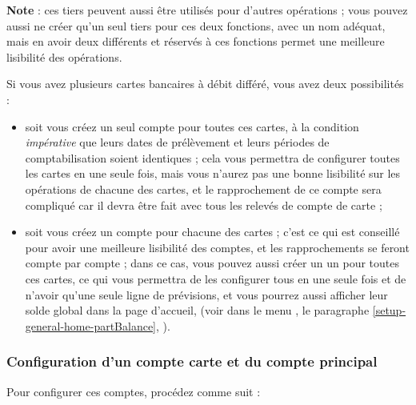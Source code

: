 \begin{enumerate}
	\textbf{Note} : ces tiers peuvent aussi être utilisés pour d'autres opérations ; vous pouvez aussi ne créer qu'un seul tiers pour ces deux fonctions, avec un nom adéquat, mais en avoir deux différents et réservés à ces fonctions permet une meilleure lisibilité des opérations. 		
\end{enumerate}

Si vous avez plusieurs cartes bancaires à débit différé, vous avez deux possibilités :

\begin{itemize}
	\item soit vous créez un seul compte pour toutes ces cartes, à la condition \emph{impérative} que leurs dates de prélèvement et leurs périodes de comptabilisation soient identiques ; cela vous permettra de configurer toutes les cartes en une seule fois, mais vous n'aurez pas une bonne lisibilité sur les opérations de chacune des cartes, et le rapprochement de ce compte sera compliqué car il devra être fait avec tous les relevés de compte de carte ;
	
	\item soit vous créez un compte pour chacune des cartes ; c'est ce qui est conseillé pour avoir une meilleure lisibilité des comptes, et les rapprochements se feront compte par compte ; dans ce cas, vous pouvez aussi créer un un  pour toutes ces cartes, ce qui vous permettra de les configurer tous en une seule fois et de n'avoir qu'une seule ligne de prévisions, et vous pourrez aussi afficher leur solde global dans la page d'accueil, (voir dans le menu , le paragraphe \vref{setup-general-home-partBalance}, ).
\end{itemize}


\subsubsection{Configuration d'un compte carte et du compte principal}

Pour configurer ces comptes, procédez comme suit :
  

